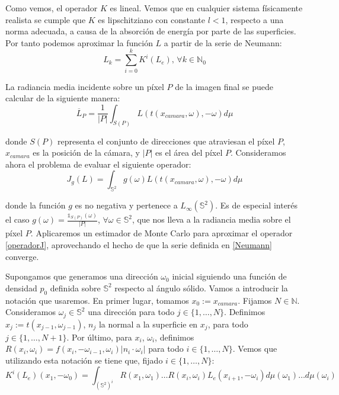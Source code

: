Como vemos, el operador $K$ es lineal. Vemos que en cualquier sistema físicamente realista se cumple que $K$ es lipschitziano con constante $l<1$, respecto a una norma adecuada, a causa de la absorción de energía por parte de las superficies. Por tanto podemos aproximar la función $L$ a partir de la serie de Neumann:
\begin{equation}\label{Neumann}
L_k = \sum_{i=0}^kK^i(L_e)\text{, }\forall k\in\mathds{N}_0
\end{equation}

La radiancia media incidente sobre un píxel $P$ de la imagen final se puede calcular de la siguiente manera:
\begin{equation}\label{pixel}
\overline{L}_P=\frac{1}{|P|}\int_{S(P)}L(t(x_{camara}, \omega), -\omega)d\mu
\end{equation}

donde $S(P)$ representa el conjunto de direcciones que atraviesan el píxel $P$, $x_{camara}$ es la posición de la cámara, y $|P|$ es el área del píxel $P$. Consideramos ahora el problema de evaluar el siguiente operador:
\begin{equation}\label{operadorJ}
J_g(L)=\int_{\mathds{S}^2}g(\omega)L(t(x_{camara}, \omega),-\omega)d\mu
\end{equation}

donde la función $g$ es no negativa y pertenece a $L_{\infty}(\mathds{S}^2)$. Es de especial interés el caso $g(\omega) = \frac{\mathds{1}_{S(P)}(\omega)}{|P|}$, $\forall \omega\in\mathds{S}^2$, que nos lleva a la radiancia media sobre el píxel $P$. Aplicaremos un estimador de Monte Carlo para aproximar el operador \ref{operadorJ}, aprovechando el hecho de que la serie definida en \ref{Neumann} converge.

Supongamos que generamos una dirección $\omega_0$ inicial siguiendo una función de densidad $p_0$ definida sobre $\mathds{S}^2$ respecto al ángulo sólido. Vamos a introducir la notación que usaremos. En primer lugar, tomamos $x_0:=x_{camara}$. Fijamos $N\in\mathds{N}$. Consideramos $\omega_j\in\mathds{S}^2$ una dirección para todo $j\in\{1,\ldots ,N\}$. Definimos $x_j:=t(x_{j-1}, \omega_{j-1})$, $n_j$ la normal a la superficie en $x_j$, para todo $j\in\{1,\ldots ,N+1\}$. Por último, para $x_i$, $\omega_i$, definimos $R(x_i,\omega_i) = f(x_i,-\omega_{i-1},\omega_i) |n_i\cdot \omega_i|$ para todo $i\in\{1,\ldots ,N\}$. Vemos que utilizando esta notación se tiene que, fijado $i\in\{1,\ldots, N\}$:
\begin{equation}\label{termino2}
K^i(L_e)(x_1, -\omega_0) = \int_{(\mathds{S}^2)^i}R(x_1,\omega_1)\ldots R(x_i,\omega_i)L_e(x_{i+1},-\omega_i)d\mu(\omega_1)\ldots d\mu(\omega_i)
\end{equation}

